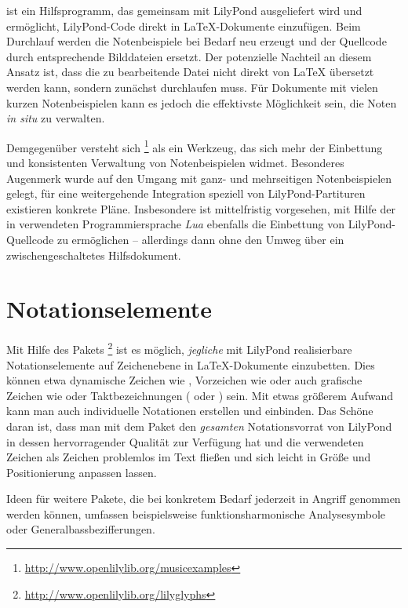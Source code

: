 \documentclass[DIV=12]{scrreprt}
\begin{document}
 ist ein Hilfsprogramm, das gemeinsam mit LilyPond ausgeliefert wird und ermöglicht, LilyPond-Code direkt in \LaTeX-Dokumente einzufügen.
Beim Durchlauf werden die Notenbeispiele bei Bedarf neu erzeugt und der Quellcode durch entsprechende Bilddateien ersetzt.
Der potenzielle Nachteil an diesem Ansatz ist, dass die zu bearbeitende Datei nicht direkt von \LaTeX{} übersetzt werden kann, sondern zunächst  durchlaufen muss.
Für Dokumente mit vielen kurzen Notenbeispielen kann es jedoch die effektivste Möglichkeit sein, die Noten \emph{in situ} zu verwalten.

Demgegenüber versteht sich %
\footnote{\url{http://www.openlilylib.org/musicexamples}} 
als ein Werkzeug, das sich mehr der Einbettung und konsistenten Verwaltung von Notenbeispielen widmet.
Besonderes Augenmerk wurde auf den Umgang mit ganz- und mehrseitigen Notenbeispielen gelegt, für eine weitergehende Integration speziell von LilyPond-Partituren existieren konkrete Pläne.
Insbesondere ist mittelfristig vorgesehen, mit Hilfe der in  verwendeten Programmiersprache \emph{Lua} ebenfalls die Einbettung von LilyPond-Quellcode zu ermöglichen -- allerdings dann ohne den Umweg über ein zwischengeschaltetes Hilfsdokument.

\section{Notationselemente}
\label{sec:pt_notational-elements}
Mit Hilfe des Pakets \lilyglyphs%
\footnote{\url{http://www.openlilylib.org/lilyglyphs}}
ist es möglich, \emph{jegliche} mit LilyPond realisierbare Notationselemente auf Zeichenebene in \LaTeX-Dokumente einzubetten.
Dies können etwa dynamische Zeichen wie , Vorzeichen wie \flatflat{} oder auch grafische Zeichen wie \crescHairpin{} oder Taktbezeichnungen ( oder \lilyTimeCHalf) sein.
Mit etwas größerem Aufwand kann man auch individuelle Notationen erstellen und einbinden.
Das Schöne daran ist, dass man mit dem Paket den \emph{gesamten} Notationsvorrat von LilyPond in dessen hervorragender Qualität zur Verfügung hat und die verwendeten Zeichen als Zeichen problemlos im Text fließen und sich leicht in Größe und Positionierung anpassen lassen.

\bigskip
Ideen für weitere Pakete, die bei konkretem Bedarf jederzeit in Angriff genommen werden können, umfassen beispielsweise funktionsharmonische Analysesymbole oder Generalbassbezifferungen.
\end{document}
